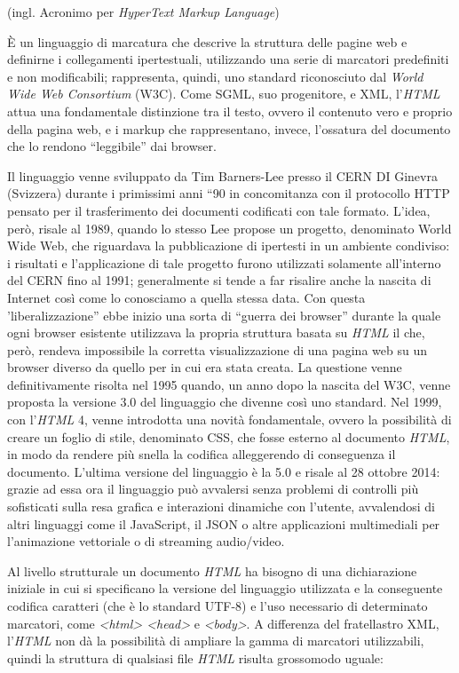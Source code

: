 \documentclass[
  b5paper,
  twoside,
  12pt,
  chapterprefix=false,
  bibliography=totocnumbered,
  parskip=false]{scrbook}
\begin{document}
(ingl. Acronimo per \emph{HyperText Markup Language})

È un linguaggio di marcatura che descrive la struttura delle pagine web
e definirne i collegamenti ipertestuali, utilizzando una serie di
marcatori predefiniti e non modificabili; rappresenta, quindi, uno
standard riconosciuto dal \emph{World Wide Web Consortium} (W3C). Come SGML,
suo progenitore, e XML, l'\emph{HTML} attua una fondamentale distinzione tra
il testo, ovvero il contenuto vero e proprio della pagina web, e i
markup che rappresentano, invece, l'ossatura del documento che lo
rendono \enquote{leggibile} dai browser.

Il linguaggio venne sviluppato da Tim Barners-Lee presso il CERN DI
Ginevra (Svizzera) durante i primissimi anni \enquote{90 in concomitanza con il
protocollo HTTP pensato per il trasferimento dei documenti codificati
con tale formato. L'idea, però, risale al 1989, quando lo stesso Lee
propose un progetto, denominato World Wide Web, che riguardava la
pubblicazione di ipertesti in un ambiente condiviso: i risultati e
l'applicazione di tale progetto furono utilizzati solamente all'interno
del CERN fino al 1991; generalmente si tende a far risalire anche la
nascita di Internet così come lo conosciamo a quella stessa data. Con
questa 'liberalizzazione} ebbe inizio una sorta di \enquote{guerra dei browser}
durante la quale ogni browser esistente utilizzava la propria struttura
basata su \emph{HTML} il che, però, rendeva impossibile la corretta
visualizzazione di una pagina web su un browser diverso da quello per in
cui era stata creata. La questione venne definitivamente risolta nel
1995 quando, un anno dopo la nascita del W3C, venne proposta la versione
3.0 del linguaggio che divenne così uno standard. Nel 1999, con l'\emph{HTML}
4, venne introdotta una novità fondamentale, ovvero la possibilità di
creare un foglio di stile, denominato CSS, che fosse esterno al
documento \emph{HTML}, in modo da rendere più snella la codifica alleggerendo
di conseguenza il documento. L'ultima versione del linguaggio è la 5.0 e
risale al 28 ottobre 2014: grazie ad essa ora il linguaggio può
avvalersi senza problemi di controlli più sofisticati sulla resa grafica
e interazioni dinamiche con l'utente, avvalendosi di altri linguaggi
come il JavaScript, il JSON o altre applicazioni multimediali per
l'animazione vettoriale o di streaming audio/video.

Al livello strutturale un documento \emph{HTML} ha bisogno di una
dichiarazione iniziale in cui si specificano la versione del linguaggio
utilizzata e la conseguente codifica caratteri (che è lo standard UTF-8)
e l'uso necessario di determinato marcatori, come \emph{\textless html\textgreater{} \textless head\textgreater{}} e
\emph{\textless body\textgreater{}}. A differenza del fratellastro XML, l'\emph{HTML} non dà la
possibilità di ampliare la gamma di marcatori utilizzabili, quindi la
struttura di qualsiasi file \emph{HTML} risulta grossomodo uguale:
\end{document}
